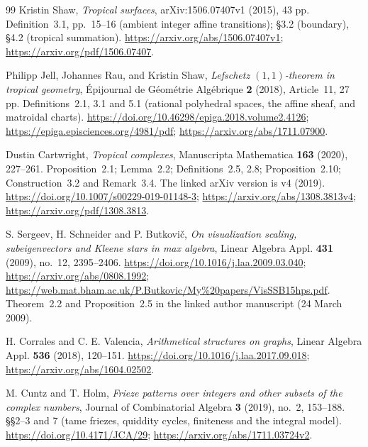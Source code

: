 \begin{thebibliography}{99}
Kristin Shaw,
\emph{Tropical surfaces},
arXiv:1506.07407v1 (2015), 43 pp.
Definition~3.1, pp.~15--16 (ambient integer affine transitions);
\S3.2 (boundary), \S4.2 (tropical summation).
\url{https://arxiv.org/abs/1506.07407v1};
\url{https://arxiv.org/pdf/1506.07407}.

Philipp Jell, Johannes Rau, and Kristin Shaw,
\emph{Lefschetz $(1,1)$-theorem in tropical geometry},
\'Epijournal de G\'eom\'etrie Alg\'ebrique \textbf{2} (2018), Article~11, 27 pp.
Definitions~2.1, 3.1 and 5.1 (rational polyhedral spaces, the affine sheaf, and matroidal charts).
\url{https://doi.org/10.46298/epiga.2018.volume2.4126};
\url{https://epiga.episciences.org/4981/pdf};
\url{https://arxiv.org/abs/1711.07900}.

Dustin Cartwright,
\emph{Tropical complexes},
Manuscripta Mathematica \textbf{163} (2020), 227--261.
Proposition~2.1; Lemma~2.2; Definitions~2.5, 2.8;
Proposition~2.10; Construction~3.2 and Remark~3.4.
The linked arXiv version is v4 (2019).
\url{https://doi.org/10.1007/s00229-019-01148-3};
\url{https://arxiv.org/abs/1308.3813v4};
\url{https://arxiv.org/pdf/1308.3813}.

S. Sergeev, H. Schneider and P. Butkovi\v c,
\emph{On visualization scaling, subeigenvectors and Kleene stars in max algebra},
Linear Algebra Appl. \textbf{431} (2009), no.~12, 2395--2406.
\url{https://doi.org/10.1016/j.laa.2009.03.040};
\url{https://arxiv.org/abs/0808.1992};
\url{https://web.mat.bham.ac.uk/P.Butkovic/My%20papers/VisSSB15hps.pdf}.
Theorem~2.2 and Proposition~2.5 in the linked author manuscript (24 March 2009).

H. Corrales and C. E. Valencia,
\emph{Arithmetical structures on graphs},
Linear Algebra Appl. \textbf{536} (2018), 120--151.
\url{https://doi.org/10.1016/j.laa.2017.09.018};
\url{https://arxiv.org/abs/1604.02502}.

M. Cuntz and T. Holm,
\emph{Frieze patterns over integers and other subsets of the complex numbers},
Journal of Combinatorial Algebra \textbf{3} (2019), no.~2, 153--188.
\S\S2--3 and 7 (tame friezes, quiddity cycles, finiteness and the integral model).
\url{https://doi.org/10.4171/JCA/29};
\url{https://arxiv.org/abs/1711.03724v2}.


\end{thebibliography}
